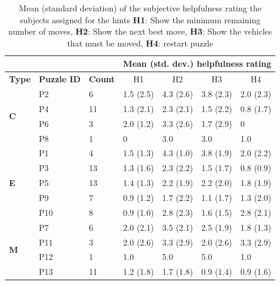 \begin{table}[tbp]
\caption{Mean (standard deviation) of the subjective helpfulness rating the subjects assigned for the hints \textbf{H1}: Show the minimum remaining number of moves, \textbf{H2}: Show the next best move, \textbf{H3}: Show the vehicles that must be moved, \textbf{H4}: restart puzzle}
\begin{tabular}{lll|l|l|l|l|}
\cline{4-7}
 &  &  & \multicolumn{4}{l|}{\textbf{Mean (std. dev.) helpfulness rating}} \\ \hline
\multicolumn{1}{|l|}{\textbf{Type}} & \multicolumn{1}{l|}{\textbf{Puzzle ID}} & \textbf{Count} & \multicolumn{1}{c|}{H1} & \multicolumn{1}{c|}{H2} & \multicolumn{1}{c|}{H3} & \multicolumn{1}{c|}{H4} \\ \hline
\multicolumn{1}{|l|}{\multirow{4}{*}{\textbf{C}}} & \multicolumn{1}{l|}{P2} & 6 & 1.5 (2.5) & 4.3 (2.6) & 3.8 (2.3) & 2.0 (2.3) \\
\multicolumn{1}{|c|}{} & \multicolumn{1}{l|}{P4} & 11 & 1.3 (2.1) & 2.3 (2.1) & 1.5 (2.2) & 0.8 (1.7) \\
\multicolumn{1}{|c|}{} & \multicolumn{1}{l|}{P6} & 3 & 2.0 (1.2) & 3.3 (2.6) & 1.7 (2.9) & 0 \\
\multicolumn{1}{|c|}{} & \multicolumn{1}{l|}{P8} & 1 & 0 & 3.0 & 3.0 & 1.0 \\ \hline
\multicolumn{1}{|l|}{\multirow{5}{*}{\textbf{E}}} & \multicolumn{1}{l|}{P1} & 4 & 1.5 (1.3) & 4.3 (1.0) & 3.8 (1.9) & 2.0 (2.2) \\
\multicolumn{1}{|l|}{} & \multicolumn{1}{l|}{P3} & 13 & 1.3 (1.6) & 2.3 (2.2) & 1.5 (1.7) & 0.8 (0.9) \\
\multicolumn{1}{|l|}{} & \multicolumn{1}{l|}{P5} & 13 & 1.4 (1.3) & 2.2 (1.9) & 2.2 (2.0) & 1.8 (1.9) \\
\multicolumn{1}{|l|}{} & \multicolumn{1}{l|}{P9} & 7 & 0.9 (1.2) & 1.7 (2.2) & 1.1 (1.7) & 1.3 (2.0) \\
\multicolumn{1}{|l|}{} & \multicolumn{1}{l|}{P10} & 8 & 0.9 (1.0) & 2.8 (2.3) & 1.6 (1.5) & 2.8 (2.1) \\ \hline
\multicolumn{1}{|l|}{\multirow{4}{*}{\textbf{M}}} & \multicolumn{1}{l|}{P7} & 6 & 2.0 (2.1) & 3.5 (2.1) & 2.5 (1.9) & 1.8 (1.3) \\
\multicolumn{1}{|l|}{} & \multicolumn{1}{l|}{P11} & 3 & 2.0 (2.6) & 3.3 (2.9) & 2.0 (2.6) & 3.3 (2.9) \\
\multicolumn{1}{|l|}{} & \multicolumn{1}{l|}{P12} & 1 & 1.0 & 5.0 & 5.0 & 1.0 \\
\multicolumn{1}{|l|}{} & \multicolumn{1}{l|}{P13} & 11 & 1.2 (1.8) & 1.7 (1.8) & 0.9 (1.4) & 0.9 (1.6) \\ \hline
\end{tabular}
\label{tab:phase2ratings}
\end{table}

